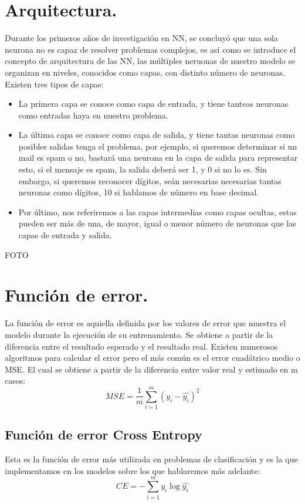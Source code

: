 \documentclass[a4paper,10pt]{article}
\begin{document}
\section{Arquitectura.}
Durante los primeros años de investigación en NN, se concluyó que una sola neurona no es capaz de resolver problemas complejos, es así como se introduce el concepto de arquitectura de las NN, las múltiples neruonas de nuestro modelo se organizan en niveles, conocidos como capas, con distinto número de neuronas. Existen tres tipos de capas:
\begin{itemize}
    \item La primera capa se conoce como capa de entrada, y tiene tanteas neuronas como entradas haya en nuestro problema. 
    \item La última capa se conoce como capa de salida, y tiene tantas neuronas como posibles salidas tenga el problema, por ejemplo, si queremos determinar si un mail es spam o no, bastará una neurona en la capa de salida para representar esto, si el mensaje es spam, la salida deberá ser 1, y 0 si no lo es. Sin embargo, si queremos reconocer dígitos, seán necesarias necesarias tantas neuronas como dígitos, 10 si hablamos de número en base decimal.
    \item Por último, nos referiremos a las capas intermedias como capas ocultas, estas pueden ser más de una, de mayor, igual o menor número de neuronas que las capas de entrada y salida.
\end{itemize} 
FOTO
\section{Función de error.}
La función de error es aquiella definida por los valores de error que muestra el modelo durante la ejecución de su entrenamiento. Se obtiene a partir de la diferencia entre el resultado esperado y el resultado real. Existen numerosos algoritmos para calcular el error pero el más común es el error cuadátrico medio o MSE. El cual se obtiene a partir de la diferencia entre valor real y estimado en m casos:
\[
MSE=\frac{1}{m}\sum_{i=1}^m (y_i - \hat{y_i})^2
\]
\subsection{Función de error Cross Entropy}
Esta es la función de error más utilizada en problemas de clasificación y es la que implementamos en los modelos sobre los que hablaremos más adelante: 
\[
CE=-\sum_{i=1}^m y_i \log\hat{y_i}
\]
\end{document}
